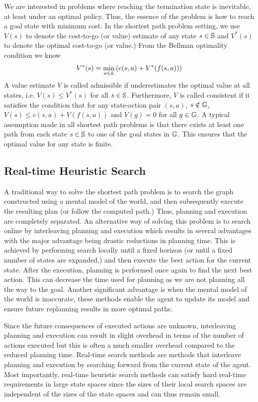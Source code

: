 We are interested in problems where reaching the termination state is
inevitable, at least under an optimal policy. Thus, the essence of the
problem is how to reach a goal state with minimum cost. In the
shortest path problem setting, we use $V(s)$ to denote the cost-to-go
(or value) estimate of any state $s \in \mathbb{S}$ and $V^*(s)$ to
denote the optimal cost-to-go (or value.) From the Bellman optimality
condition we know
\begin{equation}
  \label{eq:9}
  V^*(s) = \min_{a \in \mathbb{A}}\left( c(s, a) + V^*(f(s, a)) \right)
\end{equation}
A value estimate $V$ is called admissible if underestimates the
optimal value at all states, i.e. $V(s) \leq V^*(s)$ for all $s \in
\mathbb{S}$. Furthermore, $V$ is called consistent if it satisfies
the condition that for any state-action pair $(s, a)$, $s \notin
\mathbb{G}$, $V(s) \leq c(s, a) + V(f(s, a))$ and $V(g) = 0$ for all
$g \in \mathbb{G}$.
A typical assumption made in all shortest path problems is that there
exists at least one path from each state $s \in \mathbb{S}$ to one of
the goal states in $\mathbb{G}$. This ensures that the optimal value
for any state is finite.

\subsection{Real-time Heuristic Search}
\label{sec:real-time-heuristic-1}

A traditional way to solve the shortest path problem is to search the
graph constructed using a mental model of the world, and then
subsequently execute the resulting plan (or follow the computed path.)
Thus, planning and execution are completely separated. An alternative
way of solving this problem is to search online by interleaving
planning and execution which results in several advantages with the
major advantage being drastic reductions in planning time. This is
achieved by performing search locally until a fixed horizon (or until
a fixed number of states are expanded,) and then execute the best
action for the current state. After the execution, planning is
performed once again to find the next best action. This can decrease
the time used for planning as we are not planning all the way to the
goal. Another significant advantage is when the mental model of the
world is inaccurate, these methods enable the agent to update its
model and ensure future replanning results in more optimal paths.

Since the future consequences of executed actions are unknown,
interleaving planning and execution can result in slight overhead in
terms of the number of actions executed but this is often a much
smaller overhead compared to the reduced planning time. Real-time
search methods are methods that interleave planning and execution by
searching forward from the current state of the agent. Most
importantly, real-time heuristic search methods can satisfy hard
real-time requirements in large state spaces since the sizes of their
local search spaces are independent of the sizes
of the state spaces and can thus remain small.

